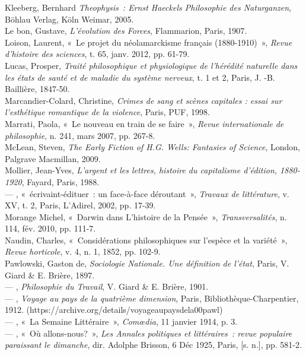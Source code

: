 Kleeberg, Bernhard \emph{Theophysis~: Ernst Haeckels Philosophie des Naturganzen}, Böhlau Verlag, Köln Weimar, 2005.\\
Le bon, Gustave, \emph{L'évolution des Forces}, Flammarion, Paris, 1907.\\
Loison, Laurent, «~Le projet du néolamarckisme français (1880-1910)~», \emph{Revue d'histoire des sciences}, t. 65, janv. 2012, pp. 61-79.\\
Lucas, Prosper, \emph{Traité philosophique et physiologique de l'hérédité naturelle dans les états de santé et de maladie du système nerveux}, t. 1 et 2, Paris, J. -B. Baillière, 1847-50.\\
Marcandier-Colard, Christine, \emph{Crimes de sang et scènes capitales : essai sur l'esthétique romantique de la violence}, Paris, PUF, 1998.\\
Marrati, Paola, «~Le nouveau en train de se faire~», \emph{Revue internationale de philosophie}, n. 241, mars 2007, pp. 267-8.\\
McLean, Steven, \emph{The Early Fiction of H.G. Wells: Fantasies of Science}, London, Palgrave Macmillan, 2009.\\
Mollier, Jean-Yves, \emph{L'argent et les lettres, histoire du capitalisme d'édition, 1880-1920}, Fayard, Paris, 1988.\\
--- , «~écrivaint-édituer~: un face-à-face déroutant~», \emph{Travaux de littérature}, v. XV, t. 2, Paris, L'Adirel, 2002, pp. 17-39. \\
Morange Michel, «~Darwin dans L'histoire de la Pensée~», \emph{Transversalités}, n. 114, fév. 2010, pp. 111-7.\\
Naudin, Charles, «~Considérations philosophiques sur l'espèce et la variété~», \emph{Revue horticole}, v. 4, n. 1, 1852, pp. 102-9.\\
Pawlowski, Gaston de, \emph{Sociologie Nationale. Une définition de l'état}, Paris, V. Giard \& E. Brière, 1897.\\
--- , \emph{Philosophie du Travail}, V. Giard \& E. Brière, 1901.\\
--- , \emph{Voyage au pays de la quatrième dimension}, Paris, Bibliothèque-Charpentier, 1912. (https:\slash\slash archive.org\slash details\slash voyageaupaysdela00pawl)\\
--- , «~La Semaine Littéraire~», \emph{Comœdia}, 11 janvier 1914, p. 3.\\
--- , «~Où allons-nous?~», \emph{Les Annales politiques et littéraires~: revue populaire paraissant le dimanche}, dir. Adolphe Brisson, 6 Déc 1925, Paris, [s. n.], pp. 581-2.\\
